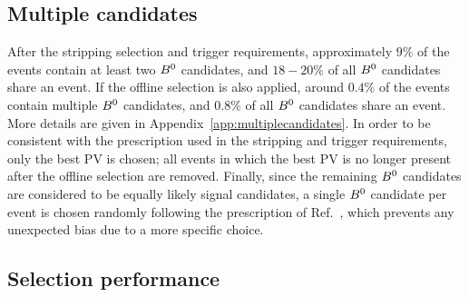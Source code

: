 \subsection{Multiple candidates}
\label{sec:multiplecandidates}

After the stripping selection and trigger requirements, approximately $9\%$ of the events contain at least two
$B^0$ candidates, and $18-20\%$ of all $B^0$ candidates share
an event. If the offline selection is also applied, around $0.4\%$ of
the events contain multiple $B^0$ candidates, and $0.8\%$ of all
$B^0$ candidates share an event. More details are given in
Appendix~\ref{app:multiplecandidates}. In order to be consistent
with the prescription used in the stripping and trigger requirements, only the
best PV is chosen; all events in which the best PV is no longer present after
the offline selection are removed. Finally, since the remaining $B^0$ candidates are considered to be equally likely
signal candidates, a single $B^0$ candidate per event is chosen randomly following
the prescription of Ref.~\cite{multipleCandidates}, which prevents any unexpected bias due to a more specific choice.

\subsection{Selection performance}
\label{sec:overallofflineselectionperformance}

